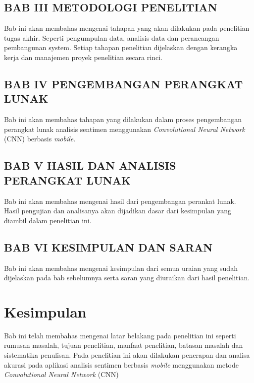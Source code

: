 \subsection{BAB III METODOLOGI PENELITIAN}
Bab ini akan membahas mengenai tahapan yang akan dilakukan pada penelitian tugas akhir.
Seperti pengumpulan data, analisis data dan perancangan pembangunan system.
Setiap tahapan penelitian dijelaskan dengan kerangka kerja dan manajemen proyek penelitian
secara rinci.

\subsection{BAB IV PENGEMBANGAN PERANGKAT LUNAK}
Bab ini akan membahas tahapan yang dilakukan dalam proses pengembangan perangkat lunak
analisis sentimen menggunakan \emph{Convolutional Neural Network} (CNN) berbasis \emph{mobile}.

\subsection{BAB V HASIL DAN ANALISIS PERANGKAT LUNAK}
Bab ini akan membahas mengenai hasil dari pengembangan perankat lunak. Hasil pengujian
dan analisanya akan dijadikan dasar dari kesimpulan yang diambil dalam penelitian ini.

\subsection{BAB VI KESIMPULAN DAN SARAN}
Bab ini akan membahas mengenai kesimpulan dari semua uraian yang sudah dijelaskan
pada bab sebelumnya serta saran yang diuraikan dari hasil penelitian.

\section{Kesimpulan}
Bab ini telah membahas mengenai latar belakang pada penelitian ini seperti rumusan masalah,
tujuan penelitian, manfaat penelitian, batasan masalah dan sistematika penulisan.
Pada penelitian ini akan dilakukan penerapan dan analisa akurasi pada aplikasi analisis
sentimen berbasis \emph{mobile} menggunakan metode \emph{Convolutional Neural Network} (CNN)